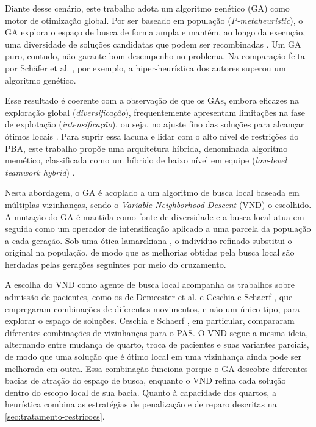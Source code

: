 Diante desse cenário, este trabalho adota um algoritmo genético (GA) como motor de otimização global. Por ser baseado em população (\textit{P-metaheuristic}), o GA explora o espaço de busca de forma ampla e mantém, ao longo da execução, uma diversidade de soluções candidatas que podem ser recombinadas \cite{talbi2009metaheuristics}. Um GA puro, contudo, não garante bom desempenho no problema. Na comparação feita por Schäfer et al. \cite{schafer2023combining}, por exemplo, a hiper-heurística dos autores superou um algoritmo genético.

Esse resultado é coerente com a observação de que os GAs, embora eficazes na exploração global (\textit{diversificação}), frequentemente apresentam limitações na fase de explotação (\textit{intensificação}), ou seja, no ajuste fino das soluções para alcançar ótimos locais \cite{talbi2009metaheuristics}. Para suprir essa lacuna e lidar com o alto nível de restrições do PBA, este trabalho propõe uma arquitetura híbrida, denominada algoritmo memético, classificada como um híbrido de baixo nível em equipe (\textit{low-level teamwork hybrid}) \cite{talbi2009metaheuristics}.

Nesta abordagem, o GA é acoplado a um algoritmo de busca local baseada em múltiplas vizinhanças, sendo o \textit{Variable Neighborhood Descent} (VND) o escolhido. A mutação do GA é mantida como fonte de diversidade e a busca local atua em seguida como um operador de intensificação aplicado a uma parcela da população a cada geração. Sob uma ótica lamarckiana \cite{talbi2009metaheuristics}, o indivíduo refinado substitui o original na população, de modo que as melhorias obtidas pela busca local são herdadas pelas gerações seguintes por meio do cruzamento.

A escolha do VND como agente de busca local acompanha os trabalhos sobre admissão de pacientes, como os de Demeester et al. \cite{demeester2010hybrid} e Ceschia e Schaerf \cite{ceschia2011local, ceschia2012modeling}, que empregaram combinações de diferentes movimentos, e não um único tipo, para explorar o espaço de soluções. Ceschia e Schaerf \cite{ceschia2011local}, em particular, compararam diferentes combinações de vizinhanças para o PAS. O VND segue a mesma ideia, alternando entre mudança de quarto, troca de pacientes e suas variantes parciais, de modo que uma solução que é ótimo local em uma vizinhança ainda pode ser melhorada em outra. Essa combinação funciona porque o GA descobre diferentes bacias de atração do espaço de busca, enquanto o VND refina cada solução dentro do escopo local de sua bacia. Quanto à capacidade dos quartos, a heurística combina as estratégias de penalização e de reparo descritas na \autoref{sec:tratamento-restricoes}.


